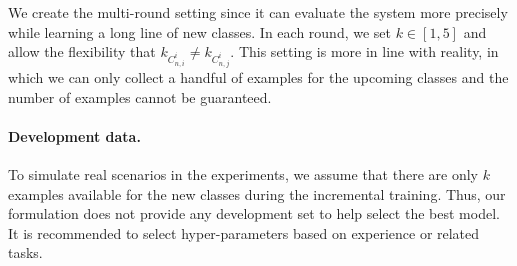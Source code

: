 \documentclass[11pt]{article}
\begin{document}
We create the multi-round setting since it can evaluate the system more precisely while learning a long line of new classes.
In each round, we set $k\in [1,5]$ and allow the flexibility that $k_{C^i_{n,i}}\neq k_{C^i_{n,j}}$. This setting is more in line with reality, in which we can only collect a handful of examples for the upcoming classes and the number of examples cannot be guaranteed.

\paragraph{Development data.} 
To simulate real scenarios in the experiments, we assume that there are only $k$ examples available for the new classes during the incremental training.
Thus, our formulation does not provide any development set to help select the best model. It is recommended to select hyper-parameters based on experience or related tasks.
\end{document}
